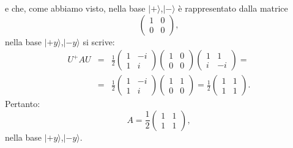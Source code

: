 e che, come abbiamo visto, nella base $| + \rangle $,$| - \rangle $ è rappresentato dalla matrice
	\begin{equation}
		\begin{pmatrix}
		1 & 0\\
		0 & 0
		\end{pmatrix} ,
	\end{equation}
nella base $| +y \rangle $,$| -y \rangle$ si scrive:
	\begin{eqnarray}
		U^+AU &=& \frac{1}{2}
		\begin{pmatrix}
		1 & -i\\
		1 & i
		\end{pmatrix}
		\begin{pmatrix}
		1 & 0\\
		0 & 0
		\end{pmatrix}
		\begin{pmatrix}
		1 & 1\\
		i & -i
		\end{pmatrix}= \nonumber \\
		&=&\frac{1}{2}
		\begin{pmatrix}
		1 & -i\\
		1 & i
		\end{pmatrix}
		\begin{pmatrix}
		1 & 1\\
		0 & 0
		\end{pmatrix}=
		\frac{1}{2}
		\begin{pmatrix}
		1 & 1\\
		1 & 1
		\end{pmatrix} .
		\end{eqnarray}
Pertanto:
	\begin{equation}
		\boxed{
			A= \frac{1}{2}
			\begin{pmatrix}
			1 & 1\\
			1 & 1
			\end{pmatrix} ,
			}
	\end{equation}
nella base $| +y \rangle $,$| -y \rangle $.\\

